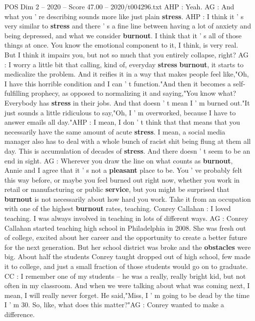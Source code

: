 \begin{textsample}{POS Dim 2 – 2020 – Score 47.00 – 2020/t004296.txt}
AHP : Yeah.
AG : And what you ' re describing sounds more like just plain \textbf{stress}.
AHP : I think it ' s very similar to \textbf{stress} and there ' s a fine line between having a lot of anxiety and being depressed, and what we consider \textbf{burnout}.
I think that it ' s all of those things at once.
You know the emotional component to it, I think, is very real.
But I think it impairs you, but not so much that you entirely collapse, right?
AG : I worry a little bit that calling, kind of, everyday \textbf{stress} \textbf{burnout}, it starts to medicalize the problem.
And it reifies it in a way that makes people feel like,"Oh, I have this horrible condition and I can ' t function."And then it becomes a self-fulfilling prophecy, as opposed to normalizing it and saying,"You know what?
Everybody has \textbf{stress} in their jobs.
And that doesn ' t mean I ' m burned out."It just sounds a little ridiculous to say,"Oh, I ' m overworked, because I have to answer emails all day."AHP : I mean, I don ' t think that that means that you necessarily have the same amount of acute \textbf{stress}.
I mean, a social media manager also has to deal with a whole bunch of racist shit being flung at them all day.
This is accumulation of decades of \textbf{stress}.
And there doesn ' t seem to be an end in sight.
AG : Wherever you draw the line on what counts as \textbf{burnout}, Annie and I agree that it ' s not a \textbf{pleasant} place to be.
You ' ve probably felt this way before, or maybe you feel burned out right now, whether you work in retail or manufacturing or public \textbf{service}, but you might be surprised that \textbf{burnout} is not necessarily about how hard you work.
Take it from an occupation with one of the highest \textbf{burnout} rates, teaching.
Conrey Callahan : I loved teaching.
I was always involved in teaching in lots of different ways.
AG : Conrey Callahan started teaching high school in Philadelphia in 2008.
She was fresh out of college, excited about her career and the opportunity to create a better future for the next generation.
But her school district was broke and the \textbf{obstacles} were big.
About half the students Conrey taught dropped out of high school, few made it to college, and just a small fraction of those students would go on to graduate.
CC : I remember one of my students -- he was a really, really bright kid, but not often in my classroom.
And when we were talking about what was coming next, I mean, I will really never forget.
He said,"Miss, I ' m going to be dead by the time I ' m 30.
So, like, what does this matter?"AG : Conrey wanted to make a difference.

\end{textsample}
